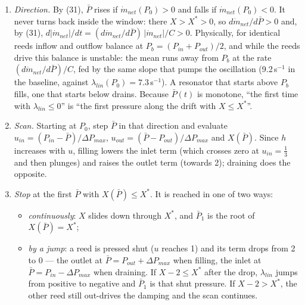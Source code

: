 \begin{enumerate}
\item \emph{Direction.} By (31), $\bar P$ rises if $\dot m_{net}(P_0) > 0$ and falls if $\dot m_{net}(P_0) < 0$. It never turns back inside the window: there $X > X^* > 0$, so $d\dot m_{net}/d\bar P > 0$ and, by (31), $d|\dot m_{net}|/dt = (d\dot m_{net}/d\bar P)\,|\dot m_{net}|/C > 0$. Physically, for identical reeds inflow and outflow balance at $P_b = (P_{in} + P_{out})/2$, and while the reeds drive this balance is unstable: the mean runs away from $P_b$ at the rate $(d\dot m_{net}/d\bar P)/C$, fed by the same slope that pumps the oscillation (9.2\,s$^{-1}$ in the baseline, against $\lambda_{lin}(P_0) = 7.3$\,s$^{-1}$). A resonator that starts above $P_b$ fills, one that starts below drains. Because $\bar P(t)$ is monotone, ``the first time with $\lambda_{lin} \le 0$'' is ``the first pressure along the drift with $X \le X^*$''.
\item \emph{Scan.} Starting at $P_0$, step $\bar P$ in that direction and evaluate $u_{in} = (P_{in} - \bar P)/\Delta P_{max}$, $u_{out} = (\bar P - P_{out})/\Delta P_{max}$ and $X(\bar P)$. Since $h$ increases with $u$, filling lowers the inlet term (which crosses zero at $u_{in} = \tfrac13$ and then plunges) and raises the outlet term (towards 2); draining does the opposite.
\item \emph{Stop} at the first $\bar P$ with $X(\bar P) \le X^*$. It is reached in one of two ways:
\begin{itemize}
\item \emph{continuously}: $X$ slides down through $X^*$, and $\bar P_1$ is the root of $X(\bar P) = X^*$;
\item \emph{by a jump}: a reed is pressed shut ($u$ reaches 1) and its term drops from 2 to 0 --- the outlet at $\bar P = P_{out} + \Delta P_{max}$ when filling, the inlet at $\bar P = P_{in} - \Delta P_{max}$ when draining. If $X - 2 \le X^*$ after the drop, $\lambda_{lin}$ jumps from positive to negative and $\bar P_1$ is that shut pressure. If $X - 2 > X^*$, the other reed still out-drives the damping and the scan continues.
\end{itemize}
\end{enumerate}

